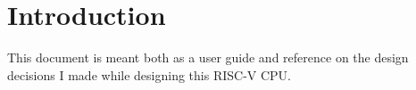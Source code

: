 \section{Introduction}

This document is meant both as a user guide and reference on the design decisions I made while designing this RISC-V CPU.